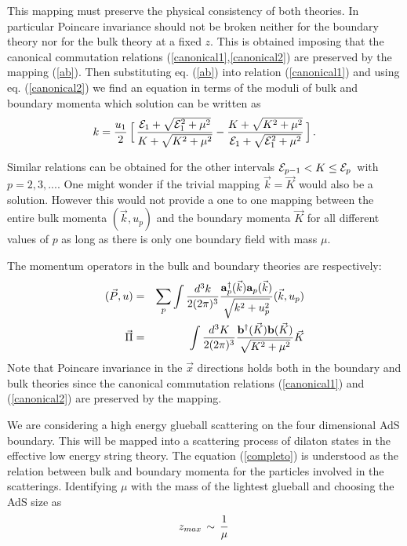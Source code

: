 \documentclass[a4paper,twocolumn,prd,groupedaddress,nofootinbib]{revtex4}
\begin{document}
\noindent This mapping must preserve the physical consistency
of both theories. In particular Poincare invariance should not be broken
neither for the boundary theory nor for the bulk theory at a fixed $z$.
This is obtained imposing that the canonical commutation relations 
(\ref{canonical1},\ref{canonical2}) are preserved by the mapping (\ref{ab}).
Then substituting eq. (\ref{ab}) into relation (\ref{canonical1}) and using 
eq. (\ref{canonical2}) 
we find an equation in terms of the moduli of bulk and boundary
momenta which solution can be written as\cite{BB2}
\begin{equation}
\label{completo}
k = {u_1 \over 2} 
\,\Big[ \,{ {\cal E}_1  +\sqrt{{\cal E}_1^2 + \mu^2 } 
			\over  K + \sqrt{K^2 + \mu^2}}
- { K + \sqrt{K^2 + \mu^2}\over {\cal E}_1  
+\sqrt{{\cal E}_1^2 + \mu^2 }}\,\Big]\,.
\end{equation}

\noindent Similar relations can be obtained for the other intervals 
${\cal E}_{p-1} < K \le {\cal E}_p \,$ with $p=2,3,...$.
One might wonder if the trivial mapping $\vec k = \vec K$ would also 
be a solution.
However this would not provide a one to one mapping between the  
entire bulk momenta
$(\vec k , u_p )$ and  
the boundary momenta $\vec K$ for all different values of $p$
as long as there is only one boundary field with mass $\mu$. 

The momentum operators in the bulk and boundary theories are respectively:
\begin{eqnarray} 
(\vec P ,u) &=& \sum_p \int {d^3k \over 2 (2\pi)^3 } 
{{\bf a}^\dagger_p ( \vec k ) {\bf a}_p ( \vec k ) \over \sqrt{k^2 + u_p^2}}
 (\vec k , u_p )\\
\vec \Pi &=&  \int {d^3K \over 2 (2\pi)^3 } 
{{\bf b}^\dagger ( \vec K ) {\bf b} ( \vec K ) \over \sqrt{K^2 + \mu^2}}
 \vec K
\end{eqnarray}
\noindent Note that Poincare invariance in the $\vec x$ directions holds 
both in 
the boundary and bulk theories since the canonical commutation relations 
(\ref{canonical1}) and (\ref{canonical2}) are preserved by the mapping.
 
We are considering a high energy glueball scattering  
on the four dimensional AdS boundary. 
This  will be mapped into a scattering process
of dilaton states in the effective low energy string theory.
The equation (\ref{completo}) 
is understood as the relation between bulk and 
boundary momenta for the particles involved in the scatterings.
Identifying $\mu$ with
the mass of the lightest glueball and choosing the AdS size as  
\begin{equation}
z_{max} \,\sim\, {1\over \mu}\,
\end{equation}
 
\end{document}
